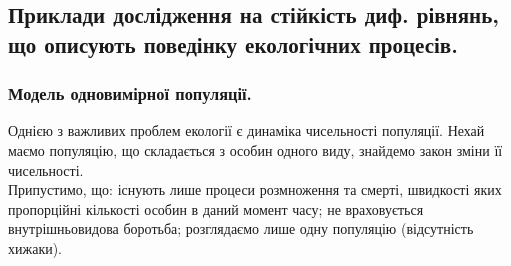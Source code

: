 \subsection{Приклади дослідження на стійкість диф. рівнянь, що описують поведінку екологічних процесів.}

\subsubsection{Модель одновимірної популяції.}

Однією з важливих проблем екології є динаміка чисельності популяції. Нехай маємо популяцію, що складається з особин одного виду, знайдемо закон зміни її чисельності.\\

Припустимо, що: існують лише процеси розмноження та смерті, швидкості яких пропорційні кількості особин в даний момент часу; не враховується внутрішньовидова боротьба; розглядаємо лише одну популяцію (відсутність хижаки). \\

